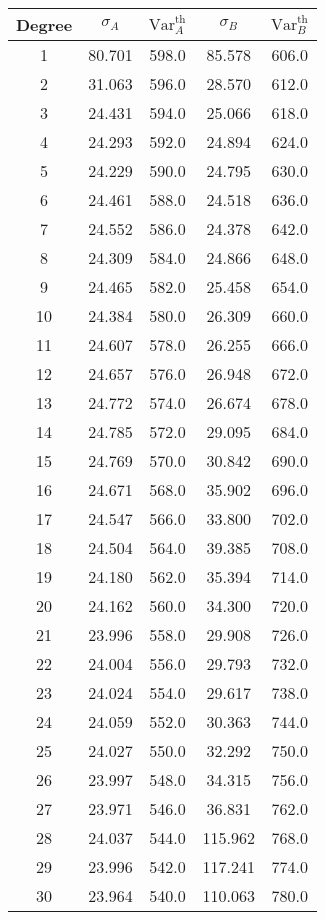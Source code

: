 \begin{tabular}{c c c c c}
\toprule
Degree & $\sigma_A$ & $\mathrm{Var}_A^{\text{th}}$ & $\sigma_B$ & $\mathrm{Var}_B^{\text{th}}$ \\
\midrule
1 & 80.701 & 598.0 & 85.578 & 606.0 \\
2 & 31.063 & 596.0 & 28.570 & 612.0 \\
3 & 24.431 & 594.0 & 25.066 & 618.0 \\
4 & 24.293 & 592.0 & 24.894 & 624.0 \\
5 & 24.229 & 590.0 & 24.795 & 630.0 \\
6 & 24.461 & 588.0 & 24.518 & 636.0 \\
7 & 24.552 & 586.0 & 24.378 & 642.0 \\
8 & 24.309 & 584.0 & 24.866 & 648.0 \\
9 & 24.465 & 582.0 & 25.458 & 654.0 \\
10 & 24.384 & 580.0 & 26.309 & 660.0 \\
11 & 24.607 & 578.0 & 26.255 & 666.0 \\
12 & 24.657 & 576.0 & 26.948 & 672.0 \\
13 & 24.772 & 574.0 & 26.674 & 678.0 \\
14 & 24.785 & 572.0 & 29.095 & 684.0 \\
15 & 24.769 & 570.0 & 30.842 & 690.0 \\
16 & 24.671 & 568.0 & 35.902 & 696.0 \\
17 & 24.547 & 566.0 & 33.800 & 702.0 \\
18 & 24.504 & 564.0 & 39.385 & 708.0 \\
19 & 24.180 & 562.0 & 35.394 & 714.0 \\
20 & 24.162 & 560.0 & 34.300 & 720.0 \\
21 & 23.996 & 558.0 & 29.908 & 726.0 \\
22 & 24.004 & 556.0 & 29.793 & 732.0 \\
23 & 24.024 & 554.0 & 29.617 & 738.0 \\
24 & 24.059 & 552.0 & 30.363 & 744.0 \\
25 & 24.027 & 550.0 & 32.292 & 750.0 \\
26 & 23.997 & 548.0 & 34.315 & 756.0 \\
27 & 23.971 & 546.0 & 36.831 & 762.0 \\
28 & 24.037 & 544.0 & 115.962 & 768.0 \\
29 & 23.996 & 542.0 & 117.241 & 774.0 \\
30 & 23.964 & 540.0 & 110.063 & 780.0 \\
\bottomrule
\end{tabular}
